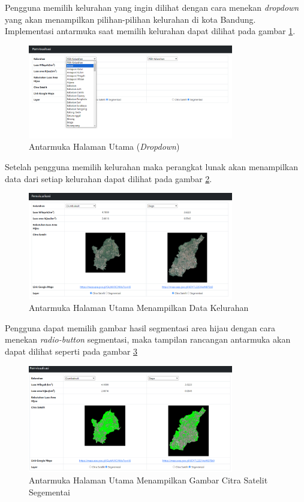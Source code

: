 \documentclass[a4paper,twoside]{article}
\begin{document}
\begin{enumerate}
		Pengguna  memilih kelurahan yang ingin dilihat dengan cara menekan \textit{dropdown} yang akan menampilkan pilihan-pilihan kelurahan di kota Bandung. Implementasi antarmuka saat memilih kelurahan dapat dilihat pada  gambar \ref{fig:home2}.
			\begin{figure}[H]
				\centering
				\includegraphics[width=0.8\textwidth]{home2.png}
				\caption{Antarmuka Halaman Utama (\textit{Dropdown})}
				\label{fig:home2}
			\end{figure} 
		Setelah pengguna memilih kelurahan maka perangkat lunak akan menampilkan data dari setiap kelurahan dapat dilihat pada gambar \ref{fig:home3}.
			\begin{figure}[H]
				\centering
				\includegraphics[width=0.8\textwidth]{home3.png}
				\caption{Antarmuka Halaman Utama Menampilkan Data Kelurahan}
				\label{fig:home3}
			\end{figure} 
		Pengguna dapat memilih gambar hasil segmentasi area hijau dengan cara menekan \textit{radio-button} segmentasi,  maka tampilan rancangan antarmuka akan dapat dilihat seperti pada gambar \ref{fig:home5}
			\begin{figure}[H]
				\centering
				\includegraphics[width=0.8\textwidth]{home5.png}
				\caption{Antarmuka Halaman Utama Menampilkan Gambar Citra Satelit Segementai}
				\label{fig:home5}
			\end{figure} 
		

\end{enumerate}
\end{document}
